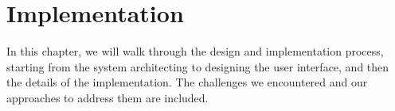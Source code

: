 \chapter{Implementation}
In this chapter, we will walk through the design and implementation process, starting from the system architecting to designing the user interface, and then the details of the implementation. The challenges we encountered and our approaches to address them are included.




